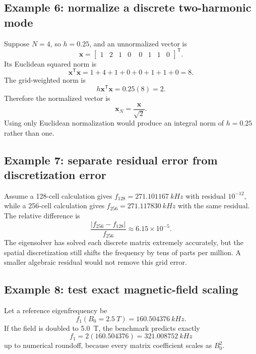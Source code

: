 \subsection{Example 6: normalize a discrete two-harmonic mode}
Suppose $N=4$, so $h=0.25$, and an unnormalized vector is
\begin{equation}
\mathbf x=
\begin{bmatrix}
1&2&1&0&\;0&1&1&0
\end{bmatrix}^{\mathsf T}.
\end{equation}
Its Euclidean squared norm is
\begin{equation}
\mathbf x^{\mathsf T}\mathbf x=1+4+1+0+0+1+1+0=8.
\end{equation}
The grid-weighted norm is
\begin{equation}
h\mathbf x^{\mathsf T}\mathbf x=0.25(8)=2.
\end{equation}
Therefore the normalized vector is
\begin{equation}
\mathbf x_N=\frac{\mathbf x}{\sqrt2}.
\end{equation}
Using only Euclidean normalization would produce an integral norm of $h=0.25$ rather than one.

\subsection{Example 7: separate residual error from discretization error}
Assume a 128-cell calculation gives $f_{128}=\SI{271.101167}{kHz}$ with residual $10^{-12}$, while a 256-cell calculation gives $f_{256}=\SI{271.117830}{kHz}$ with the same residual. The relative difference is
\begin{equation}
\frac{|f_{256}-f_{128}|}{f_{256}}
\approx6.15\times10^{-5}.
\end{equation}
The eigensolver has solved each discrete matrix extremely accurately, but the spatial discretization still shifts the frequency by tens of parts per million. A smaller algebraic residual would not remove this grid error.

\subsection{Example 8: test exact magnetic-field scaling}
Let a reference eigenfrequency be
\begin{equation}
f_1(B_0=\SI{2.5}{T})=\SI{160.504376}{kHz}.
\end{equation}
If the field is doubled to \SI{5.0}{T}, the benchmark predicts exactly
\begin{equation}
f_1=2(160.504376)=\SI{321.008752}{kHz}
\end{equation}
up to numerical roundoff, because every matrix coefficient scales as $B_0^2$.

